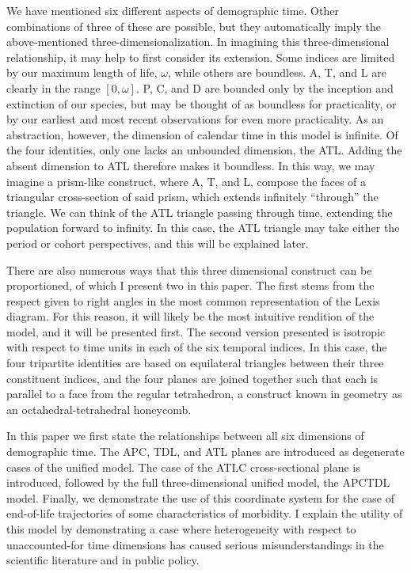 \documentclass[11pt,oneside]{article} %
\begin{document}
We have mentioned six different aspects of demographic time. Other combinations
of three of these are possible, but they automatically imply the above-mentioned
three-dimensionalization. In imagining this three-dimensional relationship,
it may help to first consider its extension. Some indices are limited
by our maximum length of life, $\omega$, while others are boundless. A, T, and L are clearly in the range $[0,\omega]$. P, C, and D are bounded only by the inception and extinction of our species, but may be
thought of as boundless for practicality, or by our earliest and most recent
observations for even more practicality. As an abstraction, however, the
dimension of calendar time in this model is infinite. Of the four identities,
only one lacks an unbounded dimension, the ATL. Adding the absent dimension to
ATL therefore makes it boundless. In this way, we may imagine a prism-like
construct, where A, T, and L, compose the faces of a triangular
cross-section of said prism, which extends infinitely ``through'' the triangle.
We can think of the ATL triangle passing through time, extending the population
forward to infinity. In this case, the ATL triangle may take either the period
or cohort perspectives, and this will be explained later. 

There are also
numerous ways that this three dimensional construct can be proportioned, of
which I present two in this paper. The first stems from the respect given to right angles in the most
common representation of the Lexis diagram. For this reason, it will likely be
the most intuitive rendition of the model, and it will be presented first. The
second version presented is isotropic with respect to time units in each of the
six temporal indices. In this case, the four tripartite identities are based on
equilateral triangles between their three constituent indices, and the four
planes are joined together such that each is parallel to a face from the regular
tetrahedron, a construct known in geometry as an octahedral-tetrahedral
honeycomb.

In this paper we first state the relationships between all six dimensions of
demographic time. The APC, TDL, and ATL planes are introduced as degenerate
cases of the unified model. The case of the ATLC cross-sectional plane is
introduced, followed by the full three-dimensional unified model, the APCTDL
model.
Finally, we demonstrate the use of this coordinate system for the case of
end-of-life trajectories of some characteristics of morbidity. I explain the
utility of this model by demonstrating a case where heterogeneity with respect
to unaccounted-for time dimensions has caused serious misunderstandings in the
scientific literature and in public policy.
\end{document}
